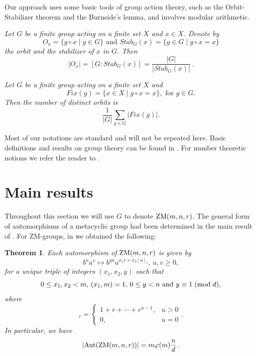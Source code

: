 \documentclass[12pt]{article}
\newtheorem{theorem}{Theorem}[section]
\newcommand{\0}{{\leqno}}
\def\barr{\begin{array}}
\def\earr{\end{array}}
\begin{document}
Our approach uses some basic tools of group action theory, such as the Orbit-Stabilizer theorem and the Burnside's lemma, and involves modular arithmetic.

\bigskip{}
{\it Let $G$ be a finite group acting on a finite set $X$ and $x\in X$. Denote by
\begin{equation}
O_x=\{g\circ x \mid g\in G\} \mbox{ and } Stab_G(x)=\{g\in G \mid g\circ x=x\}\nonumber
\end{equation}the orbit and the stabilizer of $x$ in $G$. Then 
\begin{equation}
|O_x|=[G:Stab_G(x)]=\frac{|G|}{|Stab_G(x)|}\,.\nonumber
\end{equation}}

\bigskip{}
{\it Let $G$ be a finite group acting on a finite set $X$ and
\begin{equation}
Fix(g)=\{x\in X \mid g\circ x=x\}, \mbox{ for } g\in G.\nonumber
\end{equation}Then the number of distinct orbits is
\begin{equation}
\frac{1}{|G|}\sum_{g\in G}|Fix(g)|.\nonumber
\end{equation}}
 
Most of our notations are standard and will not be repeated here. Basic definitions and results on group theory can be found in \cite{5,9}. For number theoretic notions we refer the reader to \cite{6,8}.

\section{Main results}

Throughout this section we will use $G$ to denote ${\rm ZM}(m,n,r)$. The general form of automorphisms of a metacyclic group had been determined in the main result of \cite{3}. For ZM-groups, in \cite{4} we obtained the following:

\begin{theorem}
Each automorphism of ${\rm ZM}(m,n,r)$ is given by
\begin{equation}
b^ua^v\mapsto b^{yu}a^{x_1v+x_2[u]_r},\, u,v\geq 0,\nonumber
\end{equation}for a unique triple of integers $(x_1,x_2,y)$ such that
\begin{equation}
0\leq x_1,x_2<m,\, (x_1,m)=1,\, 0\leq y<n \mbox{ and } y\equiv 1 \hspace{1mm}({\rm mod}\hspace{1mm}d),
\end{equation}where
\begin{equation}
[u]_r=\left\{\barr{lll}
    \!\!1+r+\cdots+r^{u-1},&u>0\\
    \!\!0,&u=0\earr\right..\nonumber
\end{equation}In particular, we have
\begin{equation}
|{\rm Aut}({\rm ZM}(m,n,r))|=m\varphi(m)\frac{n}{d}\,.\nonumber
\end{equation}
\end{theorem}
\end{document}
